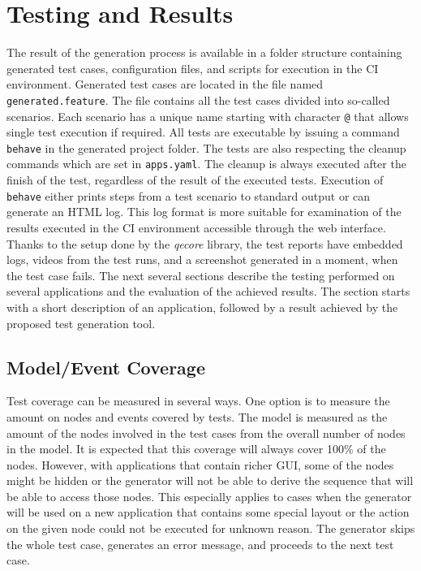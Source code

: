 

\chapter{Testing and Results}
The result of the generation process is available in a folder structure containing generated test cases, configuration files, and scripts for execution in the CI environment. Generated test cases are located in the file named \texttt{generated.feature}. The file contains all the test cases divided into so-called scenarios. Each scenario has a unique name starting with character \texttt{@} that allows single test execution if required. All tests are executable by issuing a command \texttt{behave} in the generated project folder. The tests are also respecting the cleanup commands which are set in \texttt{apps.yaml}. The cleanup is always executed after the finish of the test, regardless of the result of the executed tests. Execution of \texttt{behave} either prints steps from a test scenario to standard output or can generate an HTML log. This log format is more suitable for examination of the results executed in the CI environment accessible through the web interface. Thanks to the setup done by the \textit{qecore} library, the test reports have embedded logs, videos from the test runs, and a screenshot generated in a moment, when the test case fails. The next several sections describe the testing performed on several applications and the evaluation of the achieved results. The section starts with a short description of an application, followed by a result achieved by the proposed test generation tool.  

\section{Model/Event Coverage}
Test coverage can be measured in several ways. One option is to measure the amount on nodes and events covered by tests. The model is measured as the amount of the nodes involved in the test cases from the overall number of nodes in the model. It is expected that this coverage will always cover 100\% of the nodes. However, with applications that contain richer GUI, some of the nodes might be hidden or the generator will not be able to derive the sequence that will be able to access those nodes. This especially applies to cases when the generator will be used on a new application that contains some special layout or the action on the given node could not be executed for unknown reason. The generator skips the whole test case, generates an error message, and proceeds to the next test case. 

